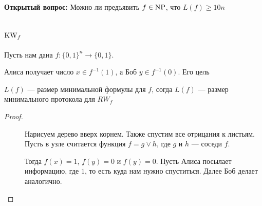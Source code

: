 \textbf{Открытый вопрос:} Можно ли предъявить $ f \in \operatorname{NP}$, что $ L(f) \ge  10n$

\section{$\operatorname{KW}_f$}

Пусть нам дана $ f\colon \{0, 1\}^{n } \to  \{0, 1\}$.

Алиса получает число $ x \in f^{-1}(1)$, а Боб $ y \in f^{-1}(0)$. Его цель %

\begin{thm}
	$ L(f) $ --- размер минимальной формулы для  $ f$, согда $ L(f)$ --- размер минимального протокола для  $ RW_f$
\end{thm}
\begin{proof}
    $ $
    \begin{description}
		\item [] Нарисуем дерево вверх корнем. Также спустим все отрицания к листьям. Пусть в узле считается функция $ f = g \vee h$, где  $ g$ и  $h$ --- соседи  $ f$.

			Тогда $ f(x) = 1$,  $ f(y) = 0$ и $ f(y) = 0$. Пусть Алиса посылает информацию, где $ 1$, то есть куда нам нужно спуститься. Далее Боб делает аналогично.%
		\item [] 
    \end{description} 
\end{proof}
